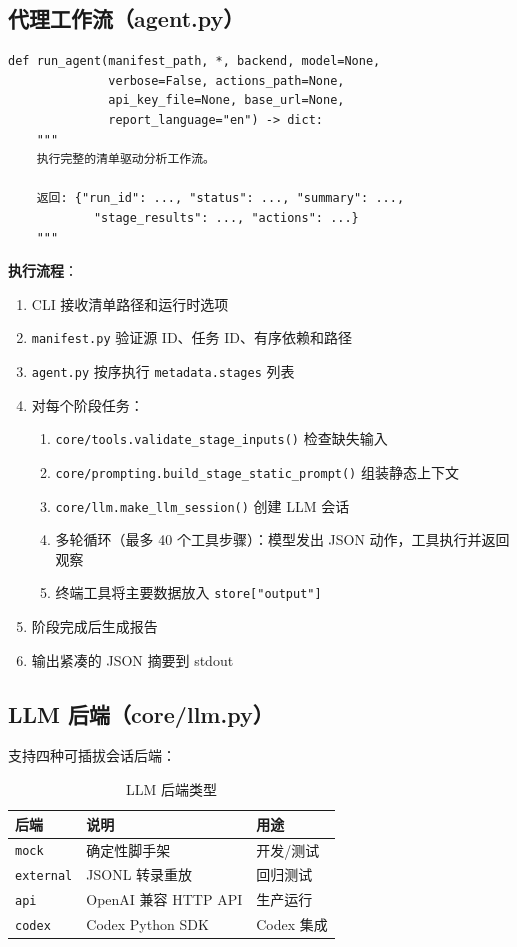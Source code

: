 \documentclass[12pt,a4paper]{ctexart}
\begin{document}
\subsection{代理工作流（agent.py）}

\begin{lstlisting}[style=pycode]
def run_agent(manifest_path, *, backend, model=None,
              verbose=False, actions_path=None,
              api_key_file=None, base_url=None,
              report_language="en") -> dict:
    """
    执行完整的清单驱动分析工作流。

    返回: {"run_id": ..., "status": ..., "summary": ...,
            "stage_results": ..., "actions": ...}
    """
\end{lstlisting}

\textbf{执行流程}：
\begin{enumerate}[itemsep=3pt]
    \item CLI 接收清单路径和运行时选项
    \item \texttt{manifest.py} 验证源 ID、任务 ID、有序依赖和路径
    \item \texttt{agent.py} 按序执行 \texttt{metadata.stages} 列表
    \item 对每个阶段任务：
    \begin{enumerate}
        \item \texttt{core/tools.validate\_stage\_inputs()} 检查缺失输入
        \item \texttt{core/prompting.build\_stage\_static\_prompt()} 组装静态上下文
        \item \texttt{core/llm.make\_llm\_session()} 创建 LLM 会话
        \item 多轮循环（最多 40 个工具步骤）：模型发出 JSON 动作，工具执行并返回观察
        \item 终端工具将主要数据放入 \texttt{store["output"]}
    \end{enumerate}
    \item 阶段完成后生成报告
    \item 输出紧凑的 JSON 摘要到 stdout
\end{enumerate}

\subsection{LLM 后端（core/llm.py）}

支持四种可插拔会话后端：

\begin{table}[h]
\centering
\begin{tabular}{@{}lll@{}}
\toprule
\textbf{后端} & \textbf{说明} & \textbf{用途} \\
\midrule
\texttt{mock}     & 确定性脚手架              & 开发/测试 \\
\texttt{external} & JSONL 转录重放            & 回归测试 \\
\texttt{api}      & OpenAI 兼容 HTTP API      & 生产运行 \\
\texttt{codex}    & Codex Python SDK          & Codex 集成 \\
\bottomrule
\end{tabular}
\caption{LLM 后端类型}
\end{table}
\end{document}
